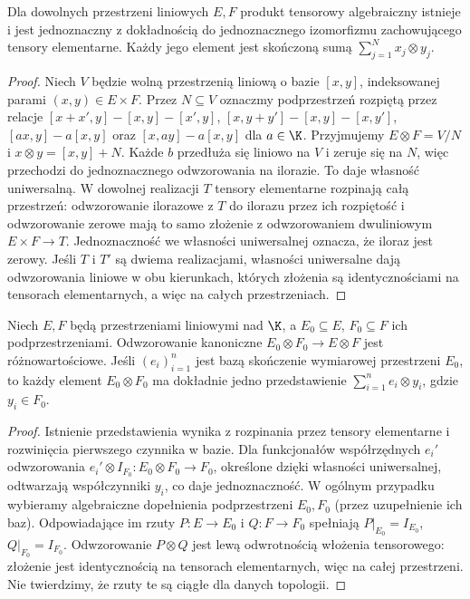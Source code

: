 \begin{stwierdzenie}
\label{prop:alg-existence24}
Dla dowolnych przestrzeni liniowych $E,F$ produkt tensorowy
algebraiczny istnieje i jest jednoznaczny z dokładnością do
jednoznacznego izomorfizmu zachowującego tensory elementarne.
Każdy jego element jest skończoną sumą $\sum_{j=1}^N x_j\otimes y_j$.
\end{stwierdzenie}
\begin{proof}
Niech $V$ będzie wolną przestrzenią liniową o bazie
$[x,y]$, indeksowanej parami $(x,y)\in E\times F$.
Przez $N\subseteq V$ oznaczmy podprzestrzeń rozpiętą przez
relacje $[x+x',y]-[x,y]-[x',y]$,
$[x,y+y']-[x,y]-[x,y']$, $[ax,y]-a[x,y]$
oraz $[x,ay]-a[x,y]$ dla $a\in\K$.
Przyjmujemy $E\otimes F=V/N$ i $x\otimes y=[x,y]+N$.
Każde $b$ przedłuża się liniowo na $V$ i zeruje się na $N$,
więc przechodzi do jednoznacznego odwzorowania na ilorazie.
To daje własność uniwersalną. W dowolnej realizacji $T$ tensory elementarne rozpinają
całą przestrzeń: odwzorowanie ilorazowe z $T$ do ilorazu
przez ich rozpiętość i odwzorowanie zerowe mają to samo
złożenie z odwzorowaniem dwuliniowym $E\times F\to T$.
Jednoznaczność we własności uniwersalnej oznacza,
że iloraz jest zerowy. Jeśli $T$ i $T'$ są dwiema
realizacjami, własności uniwersalne dają odwzorowania liniowe
w obu kierunkach, których złożenia są identycznościami na
tensorach elementarnych, a więc na całych przestrzeniach.
\end{proof}

\begin{lemat}
\label{lem:alg-inclusion24}
Niech $E,F$ będą przestrzeniami liniowymi nad $\K$,
a $E_0\subseteq E$, $F_0\subseteq F$ ich podprzestrzeniami.
Odwzorowanie kanoniczne $E_0\otimes F_0\to E\otimes F$
jest różnowartościowe. Jeśli $(e_i)_{i=1}^n$ jest bazą
skończenie wymiarowej przestrzeni $E_0$, to każdy element
$E_0\otimes F_0$ ma dokładnie jedno przedstawienie
$\sum_{i=1}^n e_i\otimes y_i$, gdzie $y_i\in F_0$.
\end{lemat}
\begin{proof}
Istnienie przedstawienia wynika z rozpinania przez tensory
elementarne i rozwinięcia pierwszego czynnika w bazie.
Dla funkcjonałów współrzędnych $e_i'$ odwzorowania
$e_i'\otimes I_{F_0}:E_0\otimes F_0\to F_0$,
określone dzięki własności uniwersalnej, odtwarzają
współczynniki $y_i$, co daje jednoznaczność.
W ogólnym przypadku wybieramy algebraiczne dopełnienia
podprzestrzeni $E_0,F_0$ (przez uzupełnienie ich baz).
Odpowiadające im rzuty $P:E\to E_0$ i $Q:F\to F_0$
spełniają $P|_{E_0}=I_{E_0}$, $Q|_{F_0}=I_{F_0}$.
Odwzorowanie $P\otimes Q$ jest lewą odwrotnością
włożenia tensorowego: złożenie jest identycznością na
tensorach elementarnych, więc na całej przestrzeni.
Nie twierdzimy, że rzuty te są ciągłe dla danych topologii.
\end{proof}


